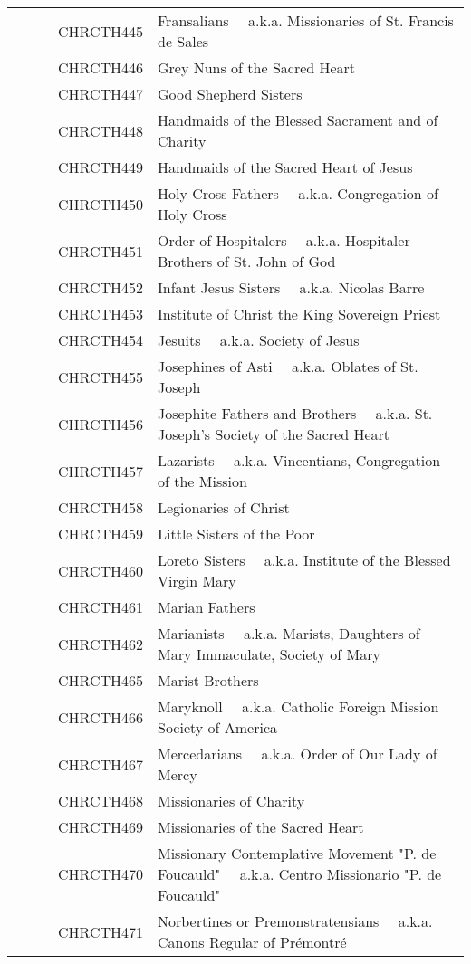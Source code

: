 \documentclass[12pt]{article}
\begin{document}
\begin{tiny}
\begin{center}
\begin{longtable}{|l|l|}
~~~~~~CHRCTH445 & Fransalians 	~~a.k.a. Missionaries of St. Francis de Sales \\
~~~~~~CHRCTH446 & Grey Nuns of the Sacred Heart \\
~~~~~~CHRCTH447 & Good Shepherd Sisters \\
~~~~~~CHRCTH448 & Handmaids of the Blessed Sacrament and of Charity \\
~~~~~~CHRCTH449 & Handmaids of the Sacred Heart of Jesus \\
~~~~~~CHRCTH450 & Holy Cross Fathers 	~~a.k.a. Congregation of Holy Cross \\
~~~~~~CHRCTH451 & Order of Hospitalers 	~~a.k.a. Hospitaler Brothers of St. John of God \\
~~~~~~CHRCTH452 & Infant Jesus Sisters 	~~a.k.a. Nicolas Barre \\
~~~~~~CHRCTH453 & Institute of Christ the King Sovereign Priest \\
~~~~~~CHRCTH454 & Jesuits 	~~a.k.a. Society of Jesus \\
~~~~~~CHRCTH455 & Josephines of Asti 	~~a.k.a. Oblates of St. Joseph \\
~~~~~~CHRCTH456 & Josephite Fathers and Brothers 	~~a.k.a. St. Joseph's Society of the Sacred Heart \\
~~~~~~CHRCTH457 & Lazarists 	~~a.k.a. Vincentians, Congregation of the Mission \\
~~~~~~CHRCTH458 & Legionaries of Christ \\
~~~~~~CHRCTH459 & Little Sisters of the Poor \\
~~~~~~CHRCTH460 & Loreto Sisters 	~~a.k.a. Institute of the Blessed Virgin Mary \\
~~~~~~CHRCTH461 & Marian Fathers \\
~~~~~~CHRCTH462 & Marianists 	~~a.k.a. Marists, Daughters of Mary Immaculate, Society of Mary \\
~~~~~~CHRCTH465 & Marist Brothers \\
~~~~~~CHRCTH466 & Maryknoll 	~~a.k.a. Catholic Foreign Mission Society of America \\
~~~~~~CHRCTH467 & Mercedarians 	~~a.k.a. Order of Our Lady of Mercy \\
~~~~~~CHRCTH468 & Missionaries of Charity \\
~~~~~~CHRCTH469 & Missionaries of the Sacred Heart \\
~~~~~~CHRCTH470 & Missionary Contemplative Movement "P. de Foucauld"	~~a.k.a. Centro Missionario "P. de Foucauld" \\
~~~~~~CHRCTH471 & Norbertines or Premonstratensians 	~~a.k.a. Canons Regular of Prémontré \\

\end{longtable}
\end{center}
\end{tiny}
\end{document}
